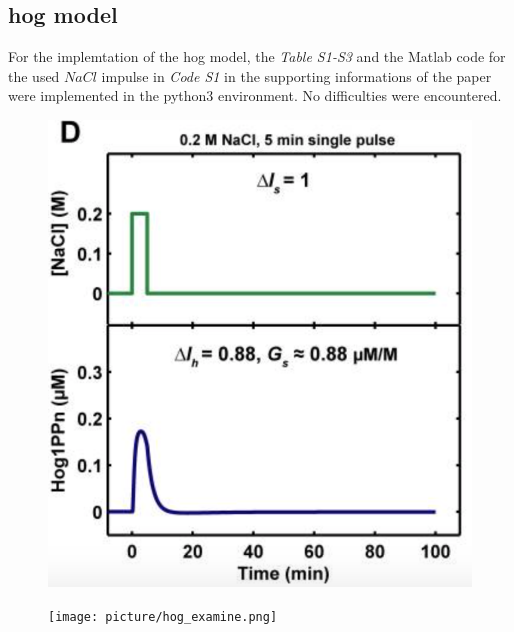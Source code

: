 \subsection{hog model}
For the implemtation of the hog model, the \textit{Table S1-S3} and the Matlab code for the used $NaCl$ impulse in \textit{Code S1 } in the supporting informations of the paper were implemented in the python3 environment. No difficulties were encountered. 

\begin{figure}[htbp]
	
	\begin{minipage}{0,5\textwidth}
		
		\includegraphics[width=\textwidth]{picture/Hog_Paper.png}
		
		\label{hogPaper} 
	\end{minipage}
	\begin{minipage}{0,5\textwidth}
		
		\texttt{[image: picture/hog\_examine.png]}
		
		\label{hogImplemented} 
	\end{minipage}
	\caption{}
\end{figure}

